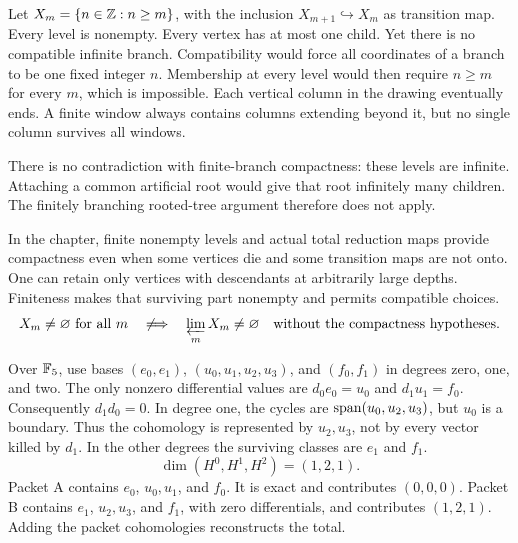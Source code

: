 Let $X_m=\{n\in\mathbb Z:n\ge m\}$, with the inclusion $X_{m+1}\hookrightarrow X_m$ as transition map. Every level is nonempty. Every vertex has at most one child. Yet there is no compatible infinite branch.
Compatibility would force all coordinates of a branch to be one fixed integer $n$. Membership at every level would then require $n\ge m$ for every $m$, which is impossible. Each vertical column in the drawing eventually ends. A finite window always contains columns extending beyond it, but no single column survives all windows.

There is no contradiction with finite-branch compactness: these levels are infinite. Attaching a common artificial root would give that root infinitely many children. The finitely branching rooted-tree argument therefore does not apply.

In the chapter, finite nonempty levels and actual total reduction maps provide compactness even when some vertices die and some transition maps are not onto. One can retain only vertices with descendants at arbitrarily large depths. Finiteness makes that surviving part nonempty and permits compatible choices.
\[
X_m\ne\varnothing\ \text{for all }m
\quad\not\Longrightarrow\quad
\varprojlim_m X_m\ne\varnothing
\quad\text{without the compactness hypotheses.}
\]

Over $\mathbb F_5$, use bases $(e_0,e_1)$, $(u_0,u_1,u_2,u_3)$, and $(f_0,f_1)$ in degrees zero, one, and two. The only nonzero differential values are $d_0e_0=u_0$ and $d_1u_1=f_0$. Consequently $d_1d_0=0$.
In degree one, the cycles are $\operatorname{span}(u_0,u_2,u_3)$, but $u_0$ is a boundary. Thus the cohomology is represented by $u_2,u_3$, not by every vector killed by $d_1$. In the other degrees the surviving classes are $e_1$ and $f_1$.
\[
\dim(H^0,H^1,H^2)=(1,2,1).
\]
Packet A contains $e_0$, $u_0,u_1$, and $f_0$. It is exact and contributes $(0,0,0)$. Packet B contains $e_1$, $u_2,u_3$, and $f_1$, with zero differentials, and contributes $(1,2,1)$. Adding the packet cohomologies reconstructs the total.

